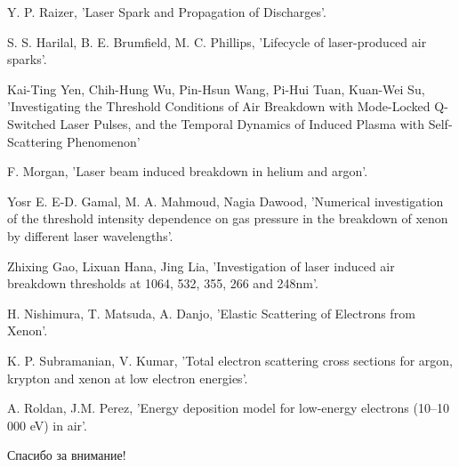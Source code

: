 \documentclass{beamer}
\begin{document}
	\begin{frame}
		\begin{thebibliography}{99} %
			\footnotesize
			Y. P. Raizer, 'Laser Spark and Propagation of Discharges'.
			
			S. S. Harilal, B. E. Brumfield, M. C. Phillips, 'Lifecycle of laser-produced air sparks'.
			
			Kai-Ting Yen, Chih-Hung Wu, Pin-Hsun Wang, Pi-Hui Tuan, Kuan-Wei Su, 'Investigating the Threshold Conditions of Air Breakdown
			with Mode-Locked Q-Switched Laser Pulses, and the Temporal
			Dynamics of Induced Plasma with Self-Scattering Phenomenon'
			
			F. Morgan, 'Laser beam induced breakdown in helium and
			argon'.
			
			Yosr E. E-D. Gamal, M. A. Mahmoud, Nagia Dawood, 'Numerical investigation of the threshold intensity dependence on gas pressure in the breakdown of xenon by different laser wavelengths'.
			
			Zhixing Gao, Lixuan Hana, Jing Lia, 'Investigation of laser induced air breakdown thresholds at 1064, 532, 355, 266 and 248nm'.
			
			H. Nishimura, T. Matsuda, A. Danjo, 'Elastic Scattering of Electrons from Xenon'.
			
			K. P. Subramanian, V. Kumar, 'Total electron scattering cross sections for argon, krypton and xenon at low electron energies'.
			
			A. Roldan, J.M. Perez, 'Energy deposition model for low-energy electrons (10–10 000 eV) in air'.
		\end{thebibliography}
	\end{frame}

	\begin{frame}[plain,c]
		
		\begin{center}
			\huge {} Спасибо за внимание!
		\end{center}
		
	\end{frame}
	
\end{document}

